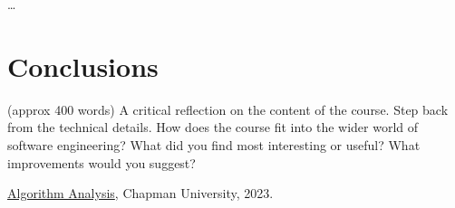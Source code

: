 \documentclass{article}
\theoremstyle{theorem}
\theoremstyle{definition}
\theoremstyle{remark}
\begin{document}
\ldots

\section{Conclusions}\label{conclusions}

(approx 400 words) A critical reflection on the content of the course. Step back from the technical details. How does the course fit into the wider world of software engineering? What did you find most interesting or useful? 
What improvements would you suggest?

\begin{thebibliography}{99}
 \href{https://github.com/alexhkurz/algorithm-analysis-2023}{Algorithm Analysis}, Chapman University, 2023.
\end{thebibliography}
\end{document}
